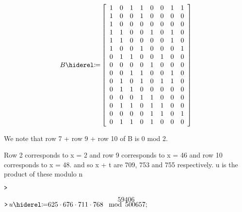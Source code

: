 \documentclass{article}
\begin{document}
\begin{dmath}\label{(7)}
B \coloneqq 
\\
\left[\begin{array}{cccccccc}
1 & 0 & 1 & 1 & 0 & 0 & 1 & 1 
\\
 1 & 0 & 0 & 1 & 0 & 0 & 0 & 0 
\\
 1 & 0 & 0 & 0 & 0 & 0 & 0 & 0 
\\
 1 & 1 & 0 & 0 & 1 & 0 & 1 & 0 
\\
 1 & 1 & 0 & 0 & 0 & 0 & 1 & 0 
\\
 1 & 0 & 0 & 1 & 0 & 0 & 0 & 1 
\\
 0 & 1 & 1 & 0 & 0 & 1 & 0 & 0 
\\
 0 & 0 & 0 & 0 & 1 & 0 & 0 & 0 
\\
 0 & 0 & 1 & 1 & 0 & 0 & 1 & 0 
\\
 0 & 1 & 0 & 1 & 0 & 1 & 1 & 0 
\\
 0 & 1 & 1 & 0 & 0 & 0 & 0 & 0 
\\
 0 & 0 & 0 & 1 & 1 & 0 & 0 & 0 
\\
 0 & 1 & 1 & 0 & 1 & 1 & 0 & 0 
\\
 0 & 0 & 0 & 0 & 1 & 1 & 0 & 1 
\\
 0 & 1 & 1 & 0 & 1 & 0 & 0 & 0 
\end{array}\right]
\end{dmath}
\begin{Maple Normal}
We note that row 7 + row 9 + row 10 of B is 0 mod 2.
\end{Maple Normal}
\begin{Maple Normal}

\end{Maple Normal}
\begin{Maple Normal}
Row 2 corresponds to x = 2 and row 9 corresponds to x = 46 and row 10 corresponds to x = 48. and so x + t are 709, 753 and 755 respectively. u is the product of these modulo n
\end{Maple Normal}
\begin{Maple Normal}

\end{Maple Normal}
\mapleinput
{$ \displaystyle \texttt{>\,}  $}

\begin{dmath}\label{(8)}
59406
\end{dmath}
\mapleinput
{$ \displaystyle \texttt{>\,} u \coloneqq 625\cdot 676\cdot 711\cdot 768\,\mod \,500657; $}
\end{document}
